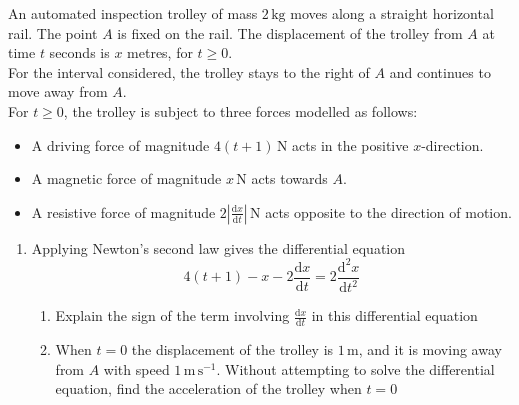 \documentclass[leqno]{article}
\begin{document}
\begin{enumerate}[
  label=\textbf{\arabic*.},
  leftmargin=*,
  topsep=0pt,
  partopsep=0pt,
  parsep=0pt
]
\newpage

\questionitem

An automated inspection trolley of mass $2\,\mathrm{kg}$ moves along a straight horizontal rail. The point $A$ is fixed on the rail. The displacement of the trolley from $A$ at time $t$ seconds is $x$ metres, for $t\ge 0$. \\

For the interval considered, the trolley stays to the right of $A$ and continues to move away from $A$. \\

For $t\ge 0$, the trolley is subject to three forces modelled as follows:
\begin{itemize}
  \item A driving force of magnitude $4(t+1)\,\mathrm{N}$ acts in the positive $x$-direction.
  \item A magnetic force of magnitude $x\,\mathrm{N}$ acts towards $A$.
  \item A resistive force of magnitude $2\left|\tfrac{\mathrm{d}x}{\mathrm{d}t}\right|\,\mathrm{N}$ acts opposite to the direction of motion.
\end{itemize}
\vspace{\baselineskip}

\begin{enumerate}[label=\textbf{(\alph*)}]
  \item Applying Newton's second law gives the differential equation
  \[
  4(t+1)-x-2\frac{\mathrm{d}x}{\mathrm{d}t}=2\frac{\mathrm{d}^2 x}{\mathrm{d} t^2}
  \]
  \begin{enumerate}[label=(\roman*)]
    \item Explain the sign of the term involving $\frac{\mathrm{d}x}{\mathrm{d}t}$ in this differential equation 
    \item When $t=0$ the displacement of the trolley is $1\,\mathrm{m}$, and it is moving away from $A$ with speed $1\,\mathrm{m\,s^{-1}}$. Without attempting to solve the differential equation, find the acceleration of the trolley when $t=0$  \\
  

\end{enumerate}
\end{enumerate}
\end{enumerate}
\end{document}
